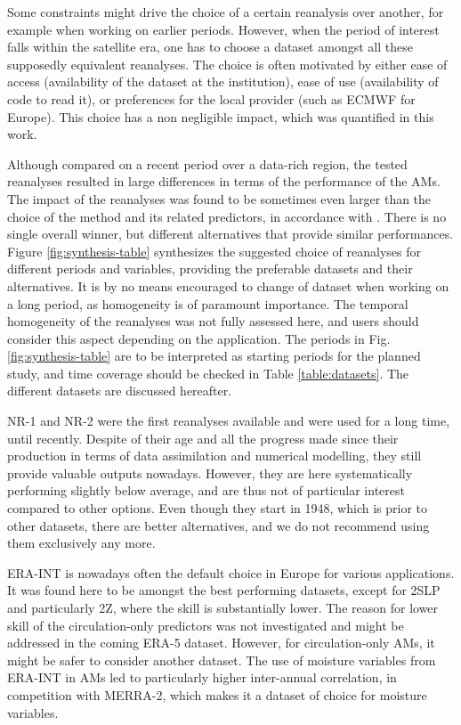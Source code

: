 \documentclass{ametsoc}
\begin{document}
Some constraints might drive the choice of a certain reanalysis over another, for example when working on earlier periods. However, when the period of interest falls within the satellite era, one has to choose a dataset amongst all these supposedly equivalent reanalyses. The choice is often motivated by either ease of access (availability of the dataset at the institution), ease of use (availability of code to read it), or  preferences for the local provider (such as ECMWF for Europe). This choice has a non negligible impact, which was quantified in this work.


Although compared on a recent period over a data-rich region, the tested reanalyses resulted in large differences in terms of the performance of the AMs. The impact of the reanalyses was found to be sometimes even larger than the choice of the method and its related predictors, in accordance with \citet{Dayon2015}. There is no single overall winner, but different alternatives that provide similar performances. Figure \ref{fig:synthesis-table} synthesizes the suggested choice of reanalyses for different periods and variables, providing the preferable datasets and their alternatives. It is by no means encouraged to change of dataset when working on a long period, as homogeneity is of paramount importance. The temporal homogeneity of the reanalyses was not fully assessed here, and users should consider this aspect depending on the application. The periods in Fig. \ref{fig:synthesis-table} are to be interpreted as starting periods for the planned study, and time coverage should be checked in Table \ref{table:datasets}. The different datasets are discussed hereafter.

NR-1 and NR-2 were the first reanalyses available and were used for a long time, until recently. Despite of their age and all the progress made since their production in terms of data assimilation and numerical modelling, they still provide valuable outputs nowadays. However, they are here systematically performing slightly below average, and are thus not of particular interest compared to other options. Even though they start in 1948, which is prior to other datasets, there are better alternatives, and we do not recommend using them exclusively any more.

ERA-INT is nowadays often the default choice in Europe for various applications. It was found here to be amongst the best performing datasets, except for 2SLP and particularly 2Z, where the skill is substantially lower. The reason for lower skill of the circulation-only predictors was not investigated and might be addressed in the coming ERA-5 dataset. However, for circulation-only AMs, it might be safer to consider another dataset. The use of moisture variables from ERA-INT in AMs led to particularly higher inter-annual correlation, in competition with MERRA-2, which makes it a dataset of choice for moisture variables.
\end{document}

